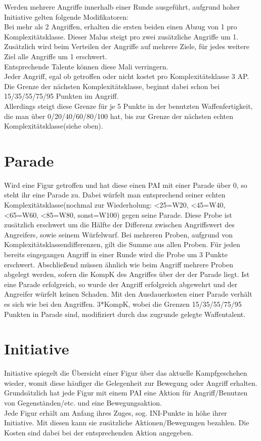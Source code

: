 \documentclass[a4paper,12pt,oneside]{book}
\begin{document}
Werden mehrere Angriffe innerhalb einer Runde ausgeführt, aufgrund hoher Initiative gelten folgende Modifikatoren:
\\Bei mehr als 2 Angriffen, erhalten die ersten beiden einen Abzug von 1 pro Komplexitätsklasse. Dieser Malus steigt pro zwei zusätzliche Angriffe um 1. Zusätzlich wird beim Verteilen der Angriffe auf mehrere Ziele, für jedes weitere Ziel alle Angriffe um 1 erschwert.
\\Entsprechende Talente können diese Mali verringern.
\\Jeder Angriff, egal ob getroffen oder nicht kostet pro Komplexitätsklasse 3 AP. Die Grenze der nächsten Komplexitätsklasse, beginnt dabei schon bei 15/35/55/75/95 Punkten im Angriff. 
\\Allerdings steigt diese Grenze für je 5 Punkte in der benutzten Waffenfertigkeit, die man über 0/20/40/60/80/100 hat, bis zur Grenze der nächsten echten Komplexitätsklasse(siehe oben). 

\section{Parade}
Wird eine Figur getroffen und hat diese einen PAI mit einer Parade über 0, so steht ihr eine Parade zu. Dabei würfelt man entsprechend seiner echten Komplexitätsklasse(nochmal zur Wiederholung: \textless25=W20, \textless45=W40, \textless65=W60, \textless85=W80, sonst=W100) gegen seine Parade. Diese Probe ist zusätzlich erschwert um die Hälfte der Differenz zwischen Angriffswert des Angreifers, sowie seinem Würfelwurf. 
Bei mehreren Proben, aufgrund von Komplexitätsklassendifferenzen, gilt die Summe aus allen Proben. Für jeden bereits eingegangen Angriff in einer Runde wird die Probe um 3 Punkte erschwert. Abschließend müssen ähnlich wie beim Angriff mehrere Proben abgelegt werden, sofern die KompK des Angriffes über der der Parade liegt.
Ist eine Parade erfolgreich, so wurde der Angriff erfolgreich abgewehrt und der Angreifer würfelt keinen Schaden.
Mit den Ausdauerkosten einer Parade verhält es sich wie bei den Angriffen. 3*KompK, wobei die Grenzen 15/35/55/75/95 Punkten in Parade sind, modifiziert durch das zugrunde gelegte Waffentalent.

\section{Initiative}
Initiative spiegelt die Übersicht einer Figur über das aktuelle Kampfgeschehen wieder, womit diese häufiger die Gelegenheit zur Bewegung oder Angriff erhalten. Grundsätzlich hat jede Figur mit einem PAI eine Aktion für Angriff/Benutzen von Gegenständen/etc. und eine Bewegungsaktion.
\\Jede Figur erhält am Anfang ihres Zuges, sog. INI-Punkte in höhe ihrer Initiative. Mit diesen kann sie zusätzliche Aktionen/Bewegungen bezahlen. Die Kosten sind dabei bei der entsprechenden Aktion angegeben.
\end{document}

